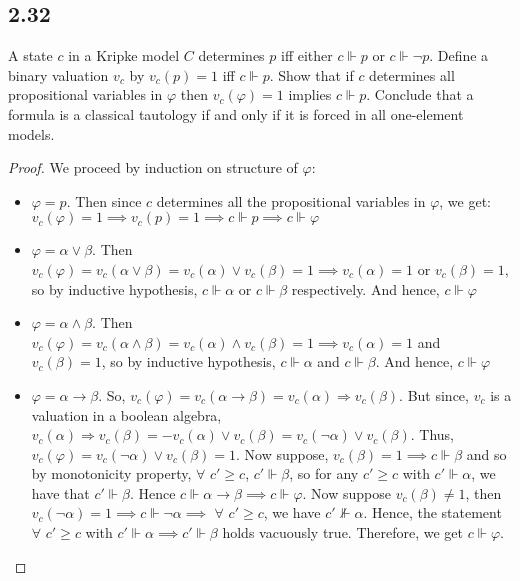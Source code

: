 \documentclass[12pt]{article}
\begin{document}
\subsection*{2.32}
A state $c$ in a Kripke model $C$ determines $p$ iff either $c \Vdash p$ or $c \Vdash \neg p$. Define a binary valuation $v_c$ by $v_c(p) = 1$ iff $c \Vdash p$. Show that if $c$ determines all propositional variables in $\varphi$ then $v_c(\varphi) = 1$ implies $c \Vdash p$. Conclude that a formula is a classical tautology if and only if it is forced in all one-element models. \\

\begin{proof}
We proceed by induction on structure of $\varphi$:

\begin{itemize}
    \item $\varphi = p$. Then since $c$ determines all the propositional variables in $\varphi$, we get:  $v_c(\varphi) = 1 \implies v_c(p) = 1 \implies c \Vdash p \implies c \Vdash \varphi$
    
    \item $\varphi = \alpha \vee \beta$. Then $v_c(\varphi) = v_c(\alpha \vee \beta) = v_c(\alpha) \vee v_c(\beta) = 1 \implies v_c(\alpha) = 1$ or $v_c(\beta) = 1$, so by inductive hypothesis, $c \Vdash \alpha$ or $c \Vdash \beta$ respectively. And hence, $c \Vdash \varphi$
    
    \item $\varphi = \alpha \wedge \beta$. Then $v_c(\varphi) = v_c(\alpha \wedge \beta) = v_c(\alpha) \wedge v_c(\beta) = 1 \implies v_c(\alpha) = 1$ and $v_c(\beta) = 1$, so by inductive hypothesis, $c \Vdash \alpha$ and $c \Vdash \beta$. And hence, $c \Vdash \varphi$
    
    \item $\varphi = \alpha \rightarrow \beta$. So, $v_c(\varphi) = v_c(\alpha \rightarrow \beta) = v_c(\alpha) \Rightarrow v_c(\beta)$. But since, $v_c$ is a valuation in a boolean algebra, $v_c(\alpha) \Rightarrow v_c(\beta) = -v_c(\alpha) \vee v_c(\beta) = v_c(\neg \alpha) \vee v_c(\beta)$. Thus, $v_c(\varphi) = v_c(\neg \alpha) \vee v_c(\beta) = 1$. Now suppose, $v_c(\beta) = 1 \implies c \Vdash \beta$ and so by monotonicity property, $\forall$ $c' \geq c$, $c' \Vdash \beta$, so for any $c' \geq c$ with $c' \Vdash \alpha$, we have that $c' \Vdash \beta$. Hence $c \Vdash \alpha \rightarrow \beta \implies c \Vdash \varphi$. Now suppose $v_c(\beta) \neq 1$, then $v_c(\neg \alpha) = 1 \implies c \Vdash \neg \alpha \implies$ $\forall$ $c' \geq c$, we have $c' \not \Vdash \alpha$. Hence, the statement $\forall$ $c' \geq c$ with $c' \Vdash \alpha \implies c' \Vdash \beta$ holds vacuously true. Therefore, we get $c \Vdash \varphi$.
\end{itemize}


\end{proof}
\end{document}
